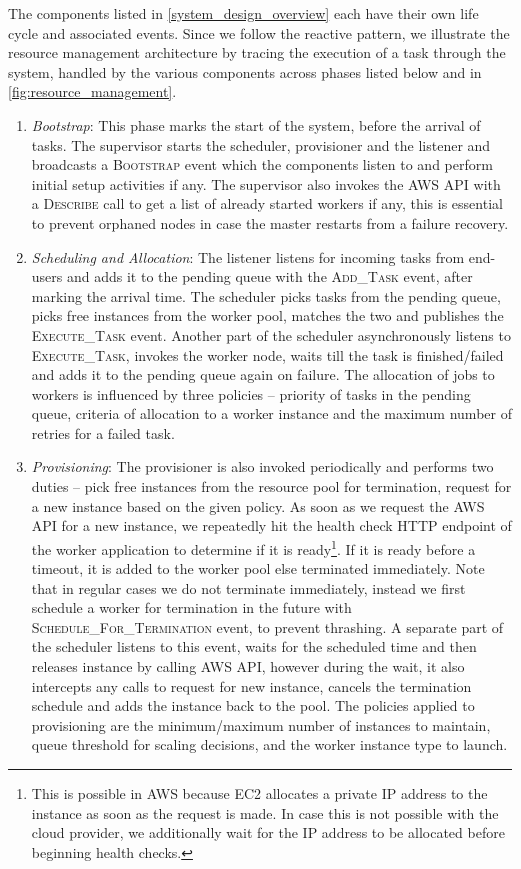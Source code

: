 \documentclass[a4paper]{IEEEtran}
\begin{document}
The components listed in \autoref{system_design_overview} each have their own life cycle and associated events.
Since we follow the reactive pattern, we illustrate the resource management architecture by tracing the execution
 of a task through the system, handled by the various components across phases listed below and in \autoref{fig:resource_management}.

\begin{enumerate}
  \item \emph{Bootstrap}: This phase marks the start of the system, before the arrival of tasks. The supervisor starts the scheduler, provisioner and the listener and 
  broadcasts a \textsc{Bootstrap} event which the components listen to and perform initial setup activities if any. The supervisor
  also invokes the AWS API with a \textsc{Describe} call to get a list of already started workers if any, this is essential to prevent
  orphaned nodes in case the master restarts from a failure recovery.

  \item \emph{Scheduling and Allocation}: The listener listens for incoming tasks from end-users and adds it to the pending queue
  with the \textsc{Add\_Task} event, after marking the arrival time. The scheduler picks
  tasks from the pending queue, picks free instances from the worker pool, matches the two and publishes the \textsc{Execute\_Task} event.
  Another part of the scheduler asynchronously listens to \textsc{Execute\_Task}, invokes the worker node, waits till 
  the task is finished/failed and adds it to the pending queue again on failure. The allocation of jobs to workers
  is influenced by three policies -- priority of tasks in the pending queue, criteria of allocation to a worker instance and
  the maximum number of retries for a failed task.

  \item \emph{Provisioning}: The provisioner is also invoked periodically and performs two duties -- pick free instances from the 
  resource pool for termination, request for a new instance based on the given policy. As soon as we request the AWS API
  for a new instance, we repeatedly hit the health check HTTP endpoint of the worker application to determine if it is ready\footnote{This is possible in AWS because EC2 allocates a private IP address to the instance as soon as the request is made. In case this 
  is not possible with the cloud provider, we additionally wait for the IP address to be allocated before beginning health checks.}.
  If it is ready before a timeout, it is added to the worker pool else terminated immediately. Note that in regular cases we do not terminate immediately,
  instead we first schedule a worker for termination in the future with \textsc{Schedule\_For\_Termination} event, to prevent thrashing.
  A separate part of the scheduler listens to this event, waits for the scheduled time and then releases instance by calling AWS API, however during the
  wait, it also intercepts any calls to request for new instance, cancels the termination schedule and adds the instance back to the pool.
  The policies applied to provisioning are the minimum/maximum number of instances to maintain, queue threshold for scaling
  decisions, and the worker instance type to launch.


\end{enumerate}
\end{document}
